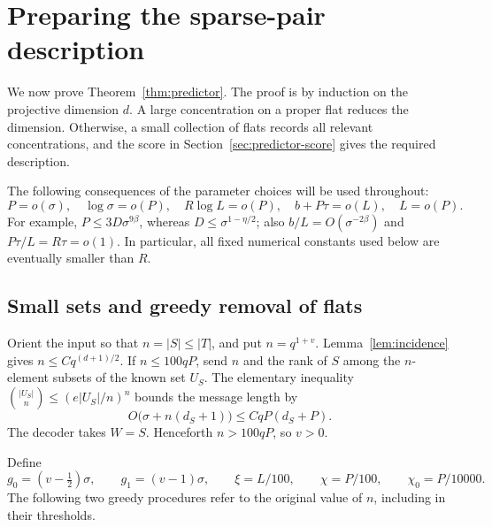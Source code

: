 \section{Preparing the sparse-pair description}
\label{sec:predictor-setup}

We now prove Theorem~\ref{thm:predictor}. The proof is by induction
on the projective dimension \(d\). A large concentration on a proper
flat reduces the dimension. Otherwise, a small collection of flats
records all relevant concentrations, and the score in
Section~\ref{sec:predictor-score} gives the required description.

The following consequences of the parameter choices will be used
throughout:
\begin{equation}
\label{eq:parameter-orders}
 P=o(\sigma),\quad \log\sigma=o(P),\quad
 R\log L=o(P),\quad b+P\tau=o(L),\quad L=o(P).
\end{equation}
For example, \(P\le3D\sigma^{9\beta}\), whereas
\(D\le\sigma^{1-\eta/2}\); also \(b/L=O(\sigma^{-2\beta})\)
and \(P\tau/L=R\tau=o(1)\).
In particular, all fixed numerical constants used below are
eventually smaller than \(R\).

\subsection{Small sets and greedy removal of flats}

Orient the input so that \(n=|S|\le|T|\), and put \(n=q^{1+v}\).
Lemma~\ref{lem:incidence} gives \(n\le Cq^{(d+1)/2}\).
If \(n\le100qP\), send \(n\) and the rank of \(S\) among the
\(n\)-element subsets of the known set \(U_S\).
The elementary inequality
\(\binom{|U_S|}{n}\le(e|U_S|/n)^n\) bounds the message length by
\[
 O\bigl(\sigma+n(d_S+1)\bigr)
 \le CqP(d_S+P).
\]
The decoder takes \(W=S\). Henceforth \(n>100qP\), so \(v>0\).

Define
\[
 g_0=(v-\tfrac12)\sigma,\qquad g_1=(v-1)\sigma,\qquad
 \xi=L/100,\qquad \chi=P/100,\qquad \chi_0=P/10000.
\]
The following two greedy procedures refer to the original value
of \(n\), including in their thresholds.

